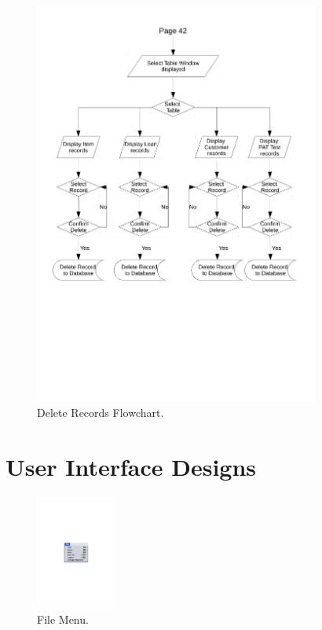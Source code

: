 \begin{figure}[H]
    \begin{center}
        \includegraphics[width=355px]{./Design/system_flowcharts/PDFs/delete_records_flowchart.pdf}
    \end{center}
    \caption{Delete Records Flowchart.} \label{fig:print_function_result}
\end{figure}

\section{User Interface Designs}

\begin{figure}[H]
    \begin{center}
        \includegraphics[width=100px]{./Design/window_designs/file_menu.pdf}
    \end{center}
    \caption{File Menu.} \label{fig:print_function_result}
\end{figure}


